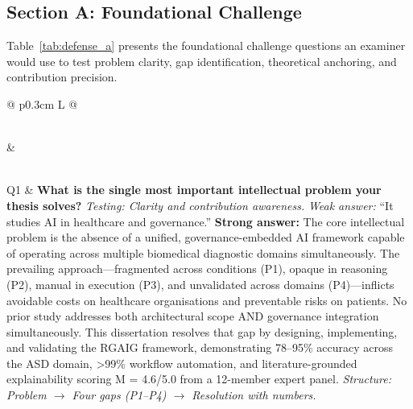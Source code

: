 \subsection{Section A: Foundational Challenge}

\noindent Table~\ref{tab:defense_a} presents the foundational challenge questions an examiner would use to test problem clarity, gap identification, theoretical anchoring, and contribution precision.

\tablefontsize
\begin{xltabular}
{\textwidth}{@{} p{0.3cm} L @{}}
\caption[Foundational Challenge Questions: Problem, Gap, Theory,]{Foundational Challenge Questions: Problem, Gap, Theory, and Contribution} \label{tab:defense_a} \\
\toprule
\thead{\#} &  \\
\midrule
\endfirsthead
\endhead
\midrule
{} \\
\endfoot
\bottomrule
\endlastfoot

Q1 & \textbf{What is the single most important intellectual problem your thesis solves?} \newline
\textit{Testing: Clarity and contribution awareness.} \newline\newline
\textit{Weak answer:} ``It studies AI in healthcare and governance.'' \newline\newline
\textbf{Strong answer:} The core intellectual problem is the absence of a unified, governance-embedded AI framework capable of operating across multiple biomedical diagnostic domains simultaneously. The prevailing approach---fragmented across conditions (P1), opaque in reasoning (P2), manual in execution (P3), and unvalidated across domains (P4)---inflicts avoidable costs on healthcare organisations and preventable risks on patients. No prior study addresses both architectural scope AND governance integration simultaneously. This dissertation resolves that gap by designing, implementing, and validating the RGAIG framework, demonstrating 78--95\% accuracy across the ASD domain, >99\% workflow automation, and literature-grounded explainability scoring M = 4.6/5.0 from a 12-member expert panel. \newline\newline
\textit{Structure: Problem $\rightarrow$ Four gaps (P1--P4) $\rightarrow$ Resolution with numbers.} \\
\addlinespace


\end{xltabular}
